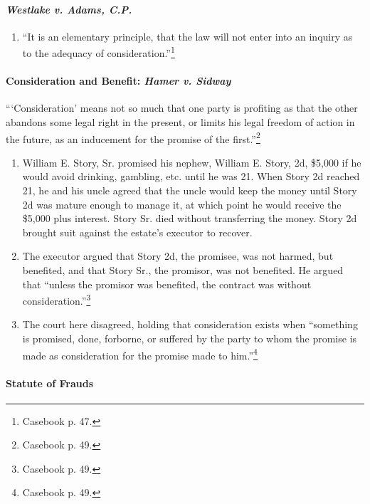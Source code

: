 \paragraph{\emph{Westlake v. Adams, C.P.}}

\begin{enumerate}
    \item ``It is an elementary principle, that the law will not enter into an 
    inquiry as to the adequacy of consideration.''\footnote{Casebook p. 47.}
\end{enumerate}
 
\paragraph{Consideration and Benefit: \emph{Hamer v. Sidway}}

\enquote{\enquote{Consideration} means not so much that one party is profiting 
as that the other abandons some legal right in the present, or limits his 
legal freedom of action in the future, as an inducement for the promise of the 
first.}\footnote{Casebook p. 49.}

\begin{enumerate}
    \item William E. Story, Sr. promised his nephew, William E. Story, 2d, 
    \$5,000 if he would avoid drinking, gambling, etc. until he was 21. When 
    Story 2d reached 21, he and his uncle agreed that the uncle would keep 
    the money until Story 2d was mature enough to manage it, at which point he 
    would receive the \$5,000 plus interest. Story Sr. died without 
    transferring the money. Story 2d brought suit against the estate's 
    executor to recover.
    \item The executor argued that Story 2d, the promisee, was not harmed, but 
    benefited, and that Story Sr., the promisor, was not benefited. He argued 
    that ``unless the promisor was benefited, the contract was without 
    consideration.''\footnote{Casebook p. 49.}
    \item The court here disagreed, holding that consideration exists when 
    ``something is promised, done, forborne, or suffered by the party to whom 
    the promise is made as consideration for the promise made to 
    him.''\footnote{Casebook p. 49.}
\end{enumerate}

\paragraph{Statute of Frauds}

